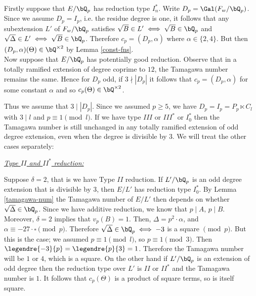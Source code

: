 \vspace{2em}

Firstly suppose that $E / \bQ_p$ has reduction type $I_{n}^{*}$. 
Write $D_p = \Gal(F_w / \bQ_p)$. Since we assume $D_p = I_p$, i.e. the residue degree is one, it follows that any subextension $L'$ of $F_{w} / \bQ_p$ satisfies $\sqrt{B} \in L' \iff \sqrt{B} \in \bQ_p$ and $\sqrt{\Delta} \in L' \iff \sqrt{B} \in \bQ_p$. 
Therefore $c_p = (D_p, \alpha)$ where $\alpha \in \{2, 4\}$. But then $(D_p, \alpha)(\Theta) \in \bQ^{\times 2}$ by Lemma \ref{const-fns}.\\

Now suppose that $E / \bQ_p$ has potentially good reduction. Observe that in a totally ramified extension of degree coprime to $12$, the Tamagawa number remains the same. Hence for $D_p$ odd, if $3 \nmid |D_p|$ it follows that $c_p = (D_p, \alpha)$ for some constant $
\alpha$ and so $c_p(\Theta) \in \bQ^{\times 2}$.

Thus we assume that $3 \mid |D_p|$. Since we assumed $p \geq 5$, we have $D_p = I_p = P_p \ltimes C_l$ with $3 \mid l$ and $p \equiv 1 \pmod l$. 
If we have type $III$ or $III^*$ or $I_0^*$ then the Tamagawa number is still unchanged in any totally ramified extension of odd degree extension, even when the degree is divisible by $3$. We will treat the other cases separately: 

\vspace{1em}

\noindent\underline{\textit{Type $II$ and $II^*$ reduction:}}

Suppose $\delta = 2$, that is we have Type $II$ reduction. If $L' / \bQ_p$ is an odd degree extension that is divisible by $3$, then $E / L'$ has reduction type $I_0^*$. By Lemma \ref{tamagawa-num} the Tamagawa number of $E / L'$ then depends on whether $\sqrt{\Delta} \in \bQ_p$. Since we have additive reduction, we know that $p \mid A$, $p \mid B$. Moreover, $\delta = 2$ implies that $v_p(B) = 1$. Then, $\Delta = p^2\cdot \alpha$, and $\alpha \equiv -27\cdot\square \pmod p$. Therefore $\sqrt{\Delta} \in \bQ_p \iff -3$ is a square $\pmod p$. But this is the case; we assumed $p \equiv 1 \pmod l$, so $p \equiv 1 \pmod 3$. Then $\legendre{-3}{p} = \legendre{p}{3} = 1$. Therefore the Tamagawa number will be $1$ or $4$, which is a square.
On the other hand if $L' / \bQ_p$ is an extension of odd degree then the reduction type over $L'$ is $II$ or $II^*$ and the Tamagawa number is $1$. It follows that $c_p(\Theta)$ is a product of square terms, so is itself square. 

